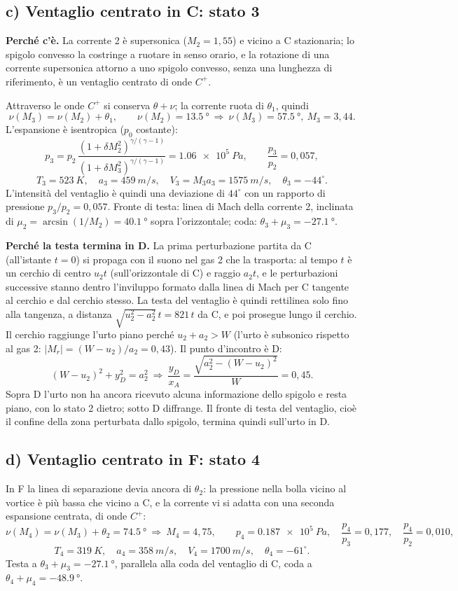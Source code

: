 \documentclass[11pt,a4paper]{article}
\newcommand{\Cp}{C^{+}}
\begin{document}
\subsection*{c) Ventaglio centrato in C: stato 3}
\textbf{Perché c'è.} La corrente 2 è supersonica ($M_2=1{,}55$) e vicino a C stazionaria; lo spigolo convesso la
costringe a ruotare in senso orario, e la rotazione di una corrente supersonica attorno a uno spigolo convesso, senza
una lunghezza di riferimento, è un ventaglio centrato di onde $\Cp$.

Attraverso le onde $\Cp$ si conserva $\theta+\nu$; la corrente ruota di $\theta_1$, quindi
\[
  \nu(M_3)=\nu(M_2)+\theta_1,\qquad \nu(M_2)=\SI{13.5}{\degree}\ \Rightarrow\ \nu(M_3)=\SI{57.5}{\degree},\ M_3=3{,}44 .
\]
L'espansione è isentropica ($p_0$ costante):
\[
  p_3=p_2\,\frac{(1+\delta M_2^2)^{\gamma/(\gamma-1)}}{(1+\delta M_3^2)^{\gamma/(\gamma-1)}}=\SI{1.06e5}{Pa},
  \qquad \frac{p_3}{p_2}=0{,}057 ,
\]
\[
  T_3=\SI{523}{K},\quad a_3=\SI{459}{m/s},\quad V_3=M_3a_3=\SI{1575}{m/s},\quad \theta_3=-44^\circ .
\]
L'intensità del ventaglio è quindi una deviazione di $44^\circ$ con un rapporto di pressione $p_3/p_2=0{,}057$. Fronte
di testa: linea di Mach della corrente 2, inclinata di $\mu_2=\arcsin(1/M_2)=\SI{40.1}{\degree}$ sopra l'orizzontale;
coda: $\theta_3+\mu_3=\SI{-27.1}{\degree}$.

\textbf{Perché la testa termina in D.} La prima perturbazione partita da C (all'istante $t=0$) si propaga con il
suono nel gas 2 che la trasporta: al tempo $t$ è un cerchio di centro $u_2t$ (sull'orizzontale di C) e raggio $a_2t$,
e le perturbazioni successive stanno dentro l'inviluppo formato dalla linea di Mach per C tangente al cerchio e dal
cerchio stesso. La testa del ventaglio è quindi rettilinea solo fino alla tangenza, a distanza
$\sqrt{u_2^2-a_2^2}\,t=821\,t$ da C, e poi prosegue lungo il cerchio. Il cerchio raggiunge l'urto piano perché
$u_2+a_2>W$ (l'urto è subsonico rispetto al gas 2: $|M_r|=(W-u_2)/a_2=0{,}43$). Il punto d'incontro è D:
\[
  (W-u_2)^2+y_D^2=a_2^2 \ \Rightarrow\ \frac{y_D}{x_A}=\frac{\sqrt{a_2^2-(W-u_2)^2}}{W}=0{,}45 .
\]
Sopra D l'urto non ha ancora ricevuto alcuna informazione dello spigolo e resta piano, con lo stato 2 dietro; sotto D
diffrange. Il fronte di testa del ventaglio, cioè il confine della zona perturbata dallo spigolo, termina quindi
sull'urto in D.

\subsection*{d) Ventaglio centrato in F: stato 4}
In F la linea di separazione devia ancora di $\theta_2$: la pressione nella bolla vicino al vortice è più bassa che
vicino a C, e la corrente vi si adatta con una seconda espansione centrata, di onde $\Cp$:
\[
  \nu(M_4)=\nu(M_3)+\theta_2=\SI{74.5}{\degree}\ \Rightarrow\ M_4=4{,}75,\qquad
  p_4=\SI{0.187e5}{Pa},\quad \frac{p_4}{p_3}=0{,}177,\quad \frac{p_4}{p_2}=0{,}010,
\]
\[
  T_4=\SI{319}{K},\quad a_4=\SI{358}{m/s},\quad V_4=\SI{1700}{m/s},\quad \theta_4=-61^\circ .
\]
Testa a $\theta_3+\mu_3=\SI{-27.1}{\degree}$, parallela alla coda del ventaglio di C, coda a
$\theta_4+\mu_4=\SI{-48.9}{\degree}$.
\end{document}
